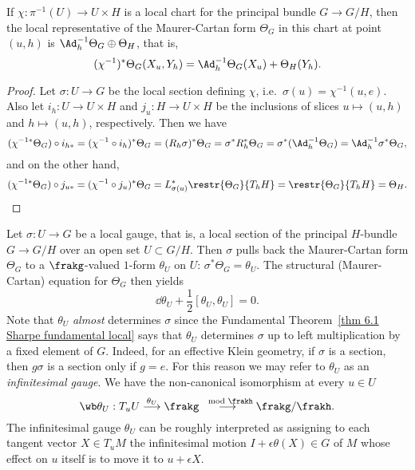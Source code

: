\begin{prop}\label{prop 4.7.1 Sharpe}
    If $\chi:\pi^{-1}(U)\to U\times H$ is a local chart for the principal bundle $G\to G\slash H$, then the local representative of the Maurer-Cartan form $\Theta_G$ in this chart at point $(u,h)$ is $\Ad_h^{-1}\Theta_G\oplus \Theta_H$, that is,
    \[(\chi^{-1})^\ast\Theta_G(X_u,Y_h)=\Ad_h^{-1}\Theta_G(X_u)+\Theta_H(Y_h).\]
\end{prop}
\begin{proof}
    Let $\sigma:U\to G$ be the local section defining $\chi$, i.e.\ $\sigma(u)=\chi^{-1}(u,e)$. Also let $i_h:U\to U\times H$ and $j_u:H\to U\times H$ be the inclusions of slices $u\mapsto (u,h)$ and $h\mapsto (u,h)$, respectively. Then we have
    \[(\chi^{-1\ast}\Theta_G)\circ i_{h\ast}=(\chi^{-1}\circ i_h)^\ast \Theta_G=(R_h\sigma)^\ast \Theta_G=\sigma^\ast R_h^\ast \Theta_G=\sigma^\ast(\Ad_h^{-1}\Theta_G)=\Ad_h^{-1}\sigma^\ast \Theta_G,\]
    and on the other hand, 
    \[(\chi^{-1\ast}\Theta_G)\circ j_{u\ast}=(\chi^{-1}\circ j_u)^\ast \Theta_G=L_{\sigma(u)}^\ast\restr{\Theta_G}{T_hH}=\restr{\Theta_G}{T_hH}=\Theta_H.\]
\end{proof}


Let $\sigma:U\to G$ be a local gauge, that is, a local section of the principal $H$-bundle $G\to G\slash H$ over an open set $U\subset G\slash H$. Then $\sigma$ pulls back the Maurer-Cartan form $\Theta_G$ to a $\frakg$-valued $1$-form $\theta_U$ on $U$: $\sigma^\ast\Theta_G=\theta_U$. The structural (Maurer-Cartan) equation for $\Theta_G$ then yields
\[\dd\theta_U+\frac 12[\theta_U,\theta_U]=0.\]
Note that $\theta_U$ \emph{almost} determines $\sigma$ since the Fundamental Theorem~\ref{thm 6.1 Sharpe fundamental local} says that $\theta_U$ determines $\sigma$ up to left multiplication by a fixed element of $G$. Indeed, for an effective Klein geometry, if $\sigma$ is a section, then $g\sigma$ is a section only if $g=e$. 
For this reason we may refer to $\theta_U$ as an \emph{infinitesimal gauge}. We have the non-canonical isomorphism at every $u\in U$
\[\wb\theta_U:T_uU\overset{\theta_U}{\longrightarrow}\frakg\overset{\mod\frakh}{\longrightarrow} \frakg\slash\frakh.\]
The infinitesimal gauge $\theta_U$ can be roughly interpreted as assigning to each tangent vector $X\in T_uM$ the infinitesimal motion $I+\epsilon\theta(X)\in G$ of $M$ whose effect on $u$ itself is to move it to $u+\epsilon X$.

